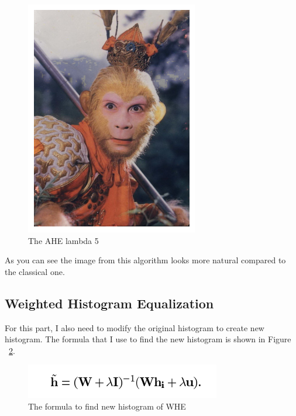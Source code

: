 \documentclass{article}
\begin{document}
	\begin{figure}[!h]
		\includegraphics[width=\linewidth]{img/ahe_lamb_5.png}
		\caption{The AHE lambda 5}
		\label{fig:ahe_lamb_5}
	\end{figure}
	
	As you can see the image from this algorithm looks more natural compared to the classical one.
	
	\subsection{Weighted Histogram Equalization}
	
	For this part, I also need to modify the original histogram to create new histogram. The formula that I use to find the new histogram is shown in Figure ~\ref{fig:WHE_formula}.
	
	\begin{figure}[!h]
		\includegraphics[width=\linewidth]{img/WHE_formula.PNG}
		\caption{The formula to find new histogram of WHE}
		\label{fig:WHE_formula}
	\end{figure}
	
\end{document}
